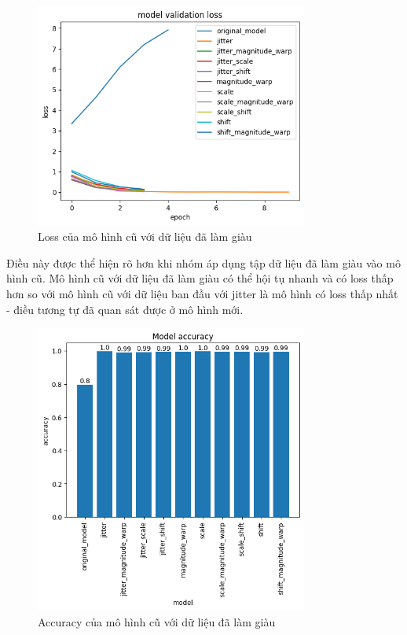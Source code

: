 \begin{figure}[H]
    \centering
    \includegraphics[width=0.8\textwidth]{Images/Improvement results/old_data_augmentation_loss.png}
    \caption{Loss của mô hình cũ với dữ liệu đã làm giàu}
    \label{fig:old_data_augmentation_loss}
\end{figure}

Điều này được thể hiện rõ hơn khi nhóm áp dụng tập dữ liệu đã làm giàu vào mô hình cũ. Mô hình cũ với dữ liệu đã làm giàu có thể hội tụ nhanh và có loss thấp hơn so với mô hình cũ với dữ liệu ban đầu với jitter là mô hình có loss thấp nhất - điều tương tự đã quan sát được ở mô hình mới.

\begin{figure}[H]
    \centering
    \includegraphics[width=0.8\textwidth]{Images/Improvement results/old_data_augmentation_accuracy.png}
    \caption{Accuracy của mô hình cũ với dữ liệu đã làm giàu}
    \label{fig:old_data_augmentation_accuracy}
\end{figure}

